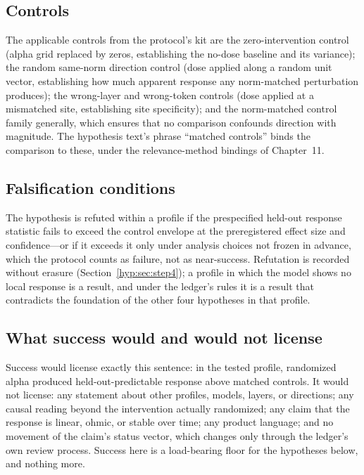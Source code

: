 \subsection{Controls}

The applicable controls from the protocol's kit are the zero-intervention control (alpha grid replaced by zeros, establishing the no-dose baseline and its variance); the random same-norm direction control (dose applied along a random unit vector, establishing how much apparent response any norm-matched perturbation produces); the wrong-layer and wrong-token controls (dose applied at a mismatched site, establishing site specificity); and the norm-matched control family generally, which ensures that no comparison confounds direction with magnitude. The hypothesis text's phrase ``matched controls'' binds the comparison to these, under the relevance-method bindings of Chapter~11.

\subsection{Falsification conditions}

The hypothesis is refuted within a profile if the prespecified held-out response statistic fails to exceed the control envelope at the preregistered effect size and confidence---or if it exceeds it only under analysis choices not frozen in advance, which the protocol counts as failure, not as near-success. Refutation is recorded without erasure (Section~\ref{hyp:sec:step4}); a profile in which the model shows no local response is a result, and under the ledger's rules it is a result that contradicts the foundation of the other four hypotheses in that profile.

\subsection{What success would and would not license}

Success would license exactly this sentence: in the tested profile, randomized alpha produced held-out-predictable response above matched controls. It would not license: any statement about other profiles, models, layers, or directions; any causal reading beyond the intervention actually randomized; any claim that the response is linear, ohmic, or stable over time; any product language; and no movement of the claim's status vector, which changes only through the ledger's own review process. Success here is a load-bearing floor for the hypotheses below, and nothing more.

